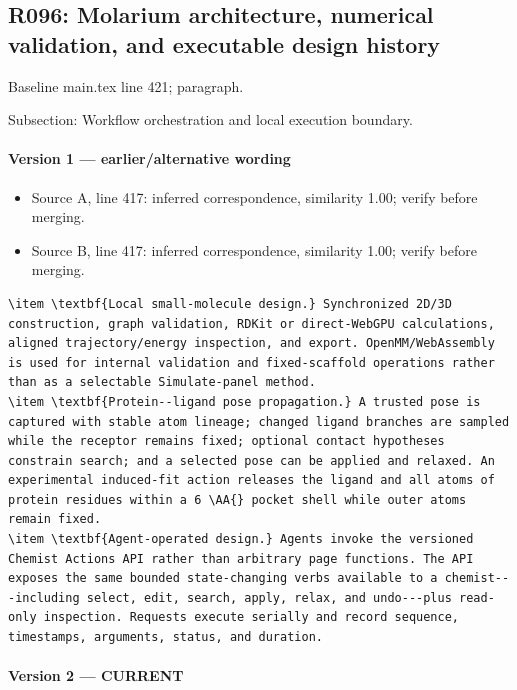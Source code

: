 \documentclass[11pt]{article}
\begin{document}
\subsection{R096: Molarium architecture, numerical validation, and executable design history}

Baseline main.tex line 421; paragraph.

Subsection: Workflow orchestration and local execution boundary.

\paragraph{Version 1 --- earlier/alternative wording}

\begin{itemize}[leftmargin=*]
\item Source A, line 417: inferred correspondence, similarity 1.00; verify before merging.
\item Source B, line 417: inferred correspondence, similarity 1.00; verify before merging.
\end{itemize}

\begin{lstlisting}
\item \textbf{Local small-molecule design.} Synchronized 2D/3D construction, graph validation, RDKit or direct-WebGPU calculations, aligned trajectory/energy inspection, and export. OpenMM/WebAssembly is used for internal validation and fixed-scaffold operations rather than as a selectable Simulate-panel method.
\item \textbf{Protein--ligand pose propagation.} A trusted pose is captured with stable atom lineage; changed ligand branches are sampled while the receptor remains fixed; optional contact hypotheses constrain search; and a selected pose can be applied and relaxed. An experimental induced-fit action releases the ligand and all atoms of protein residues within a 6 \AA{} pocket shell while outer atoms remain fixed.
\item \textbf{Agent-operated design.} Agents invoke the versioned Chemist Actions API rather than arbitrary page functions. The API exposes the same bounded state-changing verbs available to a chemist---including select, edit, search, apply, relax, and undo---plus read-only inspection. Requests execute serially and record sequence, timestamps, arguments, status, and duration.
\end{lstlisting}

\paragraph{Version 2 --- CURRENT}
\end{document}
